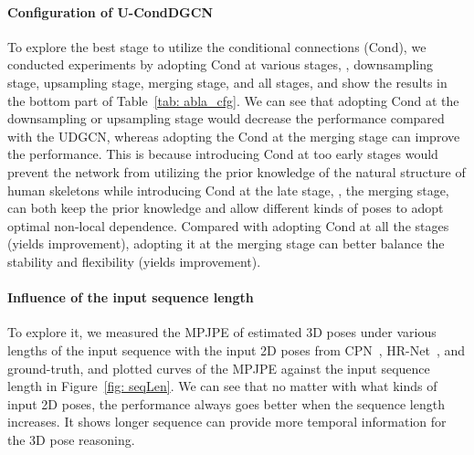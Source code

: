 \documentclass[sigconf]{acmart}
\begin{document}
\vspace{-1mm}
\paragraph{Configuration of U-CondDGCN}
To explore the best stage to utilize the conditional connections (Cond), we conducted experiments by adopting Cond at various stages, \ie, downsampling stage, upsampling stage, merging stage, and all stages, and show the results in the bottom part of Table~\ref{tab: abla_cfg}.
We can see that adopting Cond at the downsampling or upsampling stage would decrease the performance compared with the UDGCN, whereas adopting the Cond at the merging stage can improve the performance.
This is because introducing Cond at too early stages would prevent the network from utilizing the prior knowledge of the natural structure of human skeletons while introducing Cond at the late stage, \ie, the merging stage, can both keep the prior knowledge and allow different kinds of poses to adopt optimal non-local dependence.
Compared with adopting Cond at all the stages (yields  improvement), adopting it at the merging stage can better balance the stability and flexibility (yields  improvement).











\vspace{-1mm}
\paragraph{Influence of the input sequence length}
To explore it, we measured the MPJPE of estimated 3D poses under various lengths of the input sequence with the input 2D poses from CPN~\cite{chen2018cascaded}, HR-Net~\cite{sun2019deep}, and ground-truth, and plotted curves of the MPJPE against the input sequence length in Figure~\ref{fig: seqLen}.
We can see that no matter with what kinds of input 2D poses, the performance always goes better when the sequence length increases.
It shows longer sequence can provide more temporal information for the 3D pose reasoning.









\vspace{-1mm}
\end{document}
